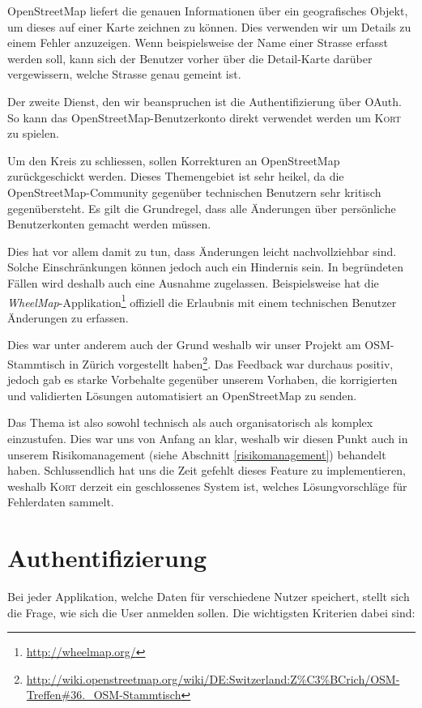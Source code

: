 \gls{OpenStreetMap} liefert die genauen Informationen über ein geografisches Objekt, um dieses auf einer Karte zeichnen zu können.
Dies verwenden wir um Details zu einem Fehler anzuzeigen.
Wenn beispielsweise der Name einer Strasse erfasst werden soll, kann sich der Benutzer vorher über die Detail-Karte darüber vergewissern, welche Strasse genau gemeint ist.

Der zweite Dienst, den wir beanspruchen ist die Authentifizierung über \gls{OAuth}.
So kann das \gls{OpenStreetMap}-Benutzerkonto direkt verwendet werden um \textsc{Kort} zu spielen.

Um den Kreis zu schliessen, sollen Korrekturen an \gls{OpenStreetMap} zurückgeschickt werden.
Dieses Themengebiet ist sehr heikel, da die \gls{OpenStreetMap}-Community gegenüber technischen Benutzern sehr kritisch gegenübersteht.
Es gilt die Grundregel, dass alle Änderungen über persönliche Benutzerkonten gemacht werden müssen.

Dies hat vor allem damit zu tun, dass Änderungen leicht nachvollziehbar sind.
Solche Einschränkungen können jedoch auch ein Hindernis sein.
In begründeten Fällen wird deshalb auch eine Ausnahme zugelassen.
Beispielsweise hat die \emph{WheelMap}-Applikation\footnote{\url{http://wheelmap.org/}} offiziell die Erlaubnis mit einem technischen Benutzer Änderungen zu erfassen.

Dies war unter anderem auch der Grund weshalb wir unser Projekt am OSM-Stammtisch in Zürich vorgestellt haben\footnote{\url{http://wiki.openstreetmap.org/wiki/DE:Switzerland:Z\%C3\%BCrich/OSM-Treffen\#36._OSM-Stammtisch}}.
Das Feedback war durchaus positiv, jedoch gab es starke Vorbehalte gegenüber unserem Vorhaben, die korrigierten und validierten Lösungen automatisiert an \gls{OpenStreetMap} zu senden.

Das Thema ist also sowohl technisch als auch organisatorisch als komplex einzustufen.
Dies war uns von Anfang an klar, weshalb wir diesen Punkt auch in unserem Risikomanagement (siehe Abschnitt \ref{risikomanagement}) behandelt haben.
Schlussendlich hat uns die Zeit gefehlt dieses Feature zu implementieren, weshalb \textsc{Kort} derzeit ein geschlossenes System ist, welches Lösungvorschläge für Fehlerdaten sammelt.

\section{Authentifizierung}
Bei jeder Applikation, welche Daten für verschiedene Nutzer speichert, stellt sich die Frage, wie sich die User anmelden sollen.
Die wichtigsten Kriterien dabei sind:

